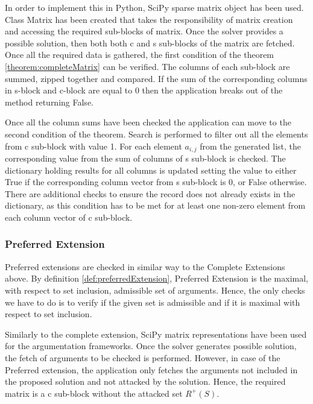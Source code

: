 In order to implement this in Python, SciPy \citep{jones2014scipy} sparse matrix object has been used. Class Matrix has been created that takes the responsibility of matrix creation and accessing the required sub-blocks of matrix. Once the solver provides a possible solution, then both both c and s sub-blocks of the matrix are fetched. Once all the required data is gathered, the first condition of the theorem \ref{theorem:completeMatrix} can be verified. The columns of each sub-block are summed, zipped together and compared. If the sum of the corresponding columns in s-block and c-block are equal to 0 then the application breaks out of the method returning False. 

Once all the column sums have been checked the application can move to the second condition of the theorem. Search is performed to filter out all the elements from c sub-block with value 1. For each element $a_{i,j}$ from the generated list, the corresponding value from the sum of columns of s sub-block is checked. The dictionary holding results for all columns is updated setting the value to either True if the corresponding column vector from s sub-block is 0, or False otherwise. There are additional checks to ensure the record does not already exists in the dictionary, as this condition has to be met for at least one non-zero element from each column vector of c sub-block.

\subsubsection{Preferred Extension} \label{section:preferredExtension}
Preferred extensions are checked in similar way to the Complete Extensions above. By definition \ref{def:preferredExtension}, Preferred Extension is the maximal, with respect to set inclusion, admissible set of arguments. Hence, the only checks we have to do is to verify if the given set is admissible and if it is maximal with respect to set inclusion.

Similarly to the complete extension, SciPy matrix representations have been used for the argumentation frameworks. Once the solver generates possible solution, the fetch of arguments to be checked is performed. However, in case of the Preferred extension, the application only fetches the arguments not included in the proposed solution and not attacked by the solution. Hence, the required matrix is a c sub-block without the attacked set $R^+(S)$.
 